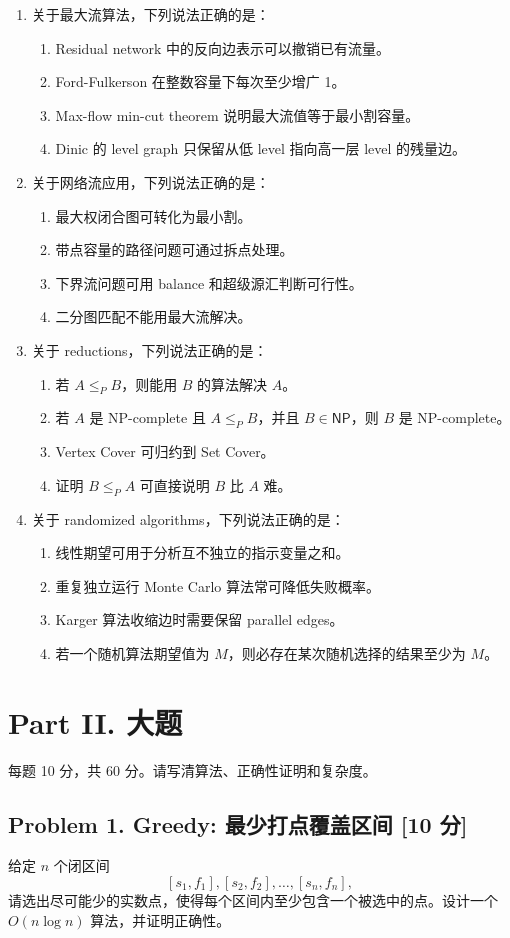 \documentclass[UTF8,a4paper,11pt]{ctexart}
\newcommand{\choice}[1]{\item[$\square$] #1}
\newcommand{\points}[1]{\hfill{\small\textbf{[#1 分]}}}
\newcommand{\NP}{\mathsf{NP}}
\begin{document}
\begin{enumerate}
  \item 关于最大流算法，下列说法正确的是：
  \begin{enumerate}
    \choice{Residual network 中的反向边表示可以撤销已有流量。}
    \choice{Ford-Fulkerson 在整数容量下每次至少增广 1。}
    \choice{Max-flow min-cut theorem 说明最大流值等于最小割容量。}
    \choice{Dinic 的 level graph 只保留从低 level 指向高一层 level 的残量边。}
  \end{enumerate}

  \item 关于网络流应用，下列说法正确的是：
  \begin{enumerate}
    \choice{最大权闭合图可转化为最小割。}
    \choice{带点容量的路径问题可通过拆点处理。}
    \choice{下界流问题可用 balance 和超级源汇判断可行性。}
    \choice{二分图匹配不能用最大流解决。}
  \end{enumerate}

  \item 关于 reductions，下列说法正确的是：
  \begin{enumerate}
    \choice{若 $A\le_P B$，则能用 $B$ 的算法解决 $A$。}
    \choice{若 $A$ 是 NP-complete 且 $A\le_P B$，并且 $B\in\NP$，则 $B$ 是 NP-complete。}
    \choice{Vertex Cover 可归约到 Set Cover。}
    \choice{证明 $B\le_P A$ 可直接说明 $B$ 比 $A$ 难。}
  \end{enumerate}

  \item 关于 randomized algorithms，下列说法正确的是：
  \begin{enumerate}
    \choice{线性期望可用于分析互不独立的指示变量之和。}
    \choice{重复独立运行 Monte Carlo 算法常可降低失败概率。}
    \choice{Karger 算法收缩边时需要保留 parallel edges。}
    \choice{若一个随机算法期望值为 $M$，则必存在某次随机选择的结果至少为 $M$。}
  \end{enumerate}
\end{enumerate}

\newpage
\section*{Part II. 大题}

每题 10 分，共 60 分。请写清算法、正确性证明和复杂度。

\subsection*{Problem 1. Greedy: 最少打点覆盖区间 \points{10}}

给定 $n$ 个闭区间
\[
[s_1,f_1],[s_2,f_2],\ldots,[s_n,f_n],
\]
请选出尽可能少的实数点，使得每个区间内至少包含一个被选中的点。设计一个 $O(n\log n)$ 算法，并证明正确性。
\end{document}
